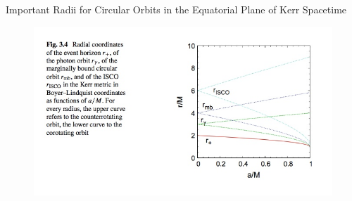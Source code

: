 \documentclass{beamer}
\begin{document}
\begin{frame}{Important Radii for Circular Orbits in the Equatorial Plane of Kerr Spacetime}
	\begin{center}
      \begin{figure}
      	\includegraphics[scale=0.4] {figures/kerrradii.jpeg}
      \end{figure}
	\end{center}	
\end{frame}
\end{document}
